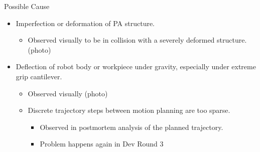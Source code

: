 \begin{itemize}
Possible Cause
\begin{itemize}
\item Imperfection or deformation of PA structure.
    \begin{itemize}
        \item Observed visually to be in collision with a severely deformed structure. (photo)
    \end{itemize}
\item Deflection of robot body or workpiece under gravity, especially under extreme grip cantilever. 
\begin{itemize}
    \item Observed visually (photo)
\item Discrete trajectory steps between motion planning are too sparse.
\begin{itemize}
    \item Observed in postmortem analysis of the planned trajectory.
    \item Problem happens again in Dev Round 3
    \end{itemize}
\end{itemize}



\end{itemize}
\end{itemize}
